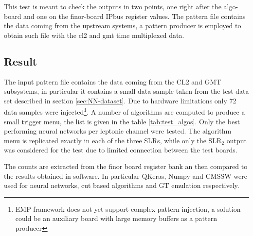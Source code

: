 \documentclass[../../main.tex]{subfiles}
\begin{document}
This test is meant to check the outputs in two points, one right after the algo-board and one on the finor-board IPbus register values.  
The pattern file contains the data coming from the upstream systems, a pattern producer is employed to obtain such file with the \acrfull{cl2} and \acrfull{gmt} time multiplexed data.  


\subsection{Result}

The input pattern file contains the data coming from the CL2 and GMT subsystems, in particular it contains a small data sample taken from the test data set described in section \ref{sec:NN-dataset}. Due to hardware limitations only 72 data samples were injected\footnote{EMP framework does not yet support complex pattern injection, a solution could be an auxiliary board with large memory buffers as a pattern producer}. A number of algorithms are computed to produce a small trigger menu, the list is given in the table \ref{tab:test_algos}. Only the best performing neural networks per leptonic channel were tested. The algorithm menu is replicated exactly in each of the three SLRs, while only the SLR$_2$ output was considered for the test due to limited connection between the test boards.  

The counts are extracted from the finor board register bank an then compared to the results obtained in software. In particular QKeras, Numpy and CMSSW were used for neural networks, cut based algorithms and GT emulation respectively.
\end{document}
